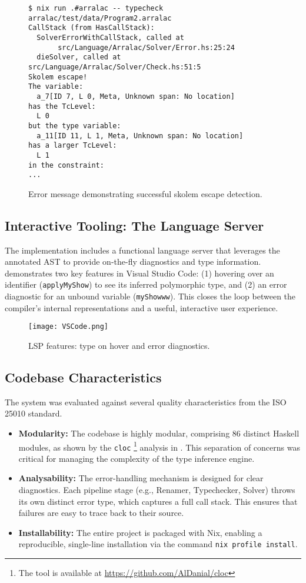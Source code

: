 \begin{figure}[h]
  \centering
  \begin{verbatim}
$ nix run .#arralac -- typecheck arralac/test/data/Program2.arralac
CallStack (from HasCallStack):
  SolverErrorWithCallStack, called at
       src/Language/Arralac/Solver/Error.hs:25:24
  dieSolver, called at src/Language/Arralac/Solver/Check.hs:51:5
Skolem escape!
The variable:
  a_7[ID 7, L 0, Meta, Unknown span: No location]
has the TcLevel:
  L 0
but the type variable:
  a_11[ID 11, L 1, Meta, Unknown span: No location]
has a larger TcLevel:
  L 1
in the constraint:
...
\end{verbatim}
  \caption{Error message demonstrating successful skolem escape detection.}
  \label{fig:skolem-escape-error}
\end{figure}

\subsection{Interactive Tooling: The Language Server}
The implementation includes a functional language server that leverages the annotated AST to provide on-the-fly diagnostics and type information.  demonstrates two key features in Visual Studio Code: (1) hovering over an identifier (\texttt{applyMyShow}) to see its inferred polymorphic type, and (2) an error diagnostic for an unbound variable (\texttt{myShowww}). This closes the loop between the compiler's internal representations and a useful, interactive user experience.

\begin{figure}[h!]
  \centering
  \texttt{[image: VSCode.png]}
  \caption{LSP features: type on hover and error diagnostics.}
  \label{fig:lsp-demo}
\end{figure}

\subsection{Codebase Characteristics}
The system was evaluated against several quality characteristics from the ISO 25010 standard.
\begin{itemize}
  \item \textbf{Modularity:} The codebase is highly modular, comprising 86 distinct Haskell modules, as shown by the \texttt{cloc} \footnote{The tool is available at \url{https://github.com/AlDanial/cloc}} analysis in . This separation of concerns was critical for managing the complexity of the type inference engine.
  \item \textbf{Analysability:} The error-handling mechanism is designed for clear diagnostics. Each pipeline stage (e.g., Renamer, Typechecker, Solver) throws its own distinct error type, which captures a full call stack. This ensures that failures are easy to trace back to their source.
  \item \textbf{Installability:} The entire project is packaged with Nix, enabling a reproducible, single-line installation via the command \texttt{nix profile install}.
\end{itemize}

